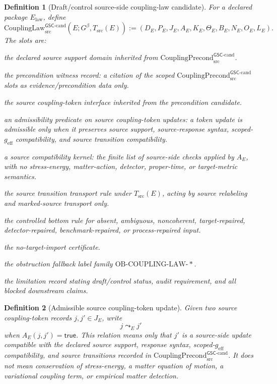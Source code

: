 \documentclass[11pt]{article}
\newcommand{\Gbeta}{G^\beta}
\newcommand{\geff}{g_{\mathrm{eff}}}
\newcommand{\CouplingPrecond}{\mathrm{CouplingPrecond}^{\mathsf{GSC}\mbox{-}\mathrm{cand}}_{\mathrm{src}}}
\newcommand{\CouplingLaw}{\mathrm{CouplingLaw}^{\mathsf{GSC}\mbox{-}\mathrm{cand}}_{\mathrm{src}}}
\newcommand{\OBLAW}{\mathrm{OB}\mbox{-}\mathrm{COUPLING}\mbox{-}\mathrm{LAW}}
\newtheorem{definition}{Definition}
\begin{document}
\begin{definition}[Draft/control source-side coupling-law candidate]
For a declared package \(E_{\mathrm{law}}\), define
\[
  \CouplingLaw(E;\Gbeta,T_{\mathrm{src}}(E)) :=
  (D_E,P_E,J_E,A_E,K_E,\Theta_E,B_E,N_E,O_E,L_E).
\]
The slots are:
\begin{description}[leftmargin=*]
  \item[\(D_E\)] the declared source support domain inherited from
  \(\CouplingPrecond\).
  \item[\(P_E\)] the precondition witness record: a citation of the scoped
  \(\CouplingPrecond\) slots as evidence/precondition data only.
  \item[\(J_E\)] the source coupling-token interface inherited from the
  precondition candidate.
  \item[\(A_E\)] an admissibility predicate on source coupling-token updates:
  a token update is admissible only when it preserves source support,
  source-response syntax, scoped-\(\geff\) compatibility, and source
  transition compatibility.
  \item[\(K_E\)] a source compatibility kernel: the finite list of source-side
  checks applied by \(A_E\), with no stress-energy, matter-action, detector,
  proper-time, or target-metric semantics.
  \item[\(\Theta_E\)] the source transition transport rule under
  \(T_{\mathrm{src}}(E)\), acting by source relabeling and marked-source
  transport only.
  \item[\(B_E\)] the controlled bottom rule for absent, ambiguous,
  noncoherent, target-repaired, detector-repaired, benchmark-repaired, or
  process-repaired input.
  \item[\(N_E\)] the no-target-import certificate.
  \item[\(O_E\)] the obstruction fallback label family
  \(\OBLAW\text{-}\ast\).
  \item[\(L_E\)] the limitation record stating draft/control status, audit
  requirement, and all blocked downstream claims.
\end{description}
\end{definition}

\begin{definition}[Admissible source coupling-token update]
Given two source coupling-token records \(j,j'\in J_E\), write
\[
  j \leadsto_E j'
\]
when \(A_E(j,j')=\mathsf{true}\). This relation means only that \(j'\) is a
source-side update compatible with the declared source support, response
syntax, scoped-\(\geff\) compatibility, and source transitions recorded in
\(\CouplingPrecond\). It does not mean conservation of stress-energy, a
matter equation of motion, a variational coupling term, or empirical matter
detection.
\end{definition}
\end{document}
